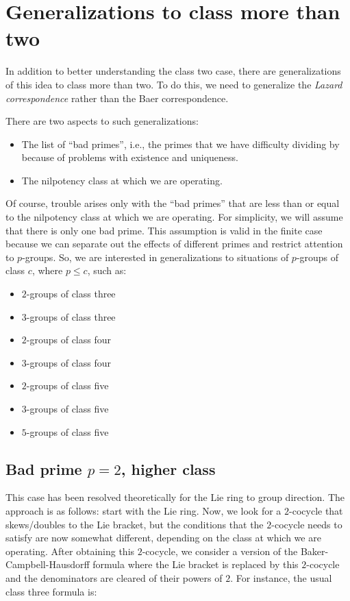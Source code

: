 \documentclass[10pt]{amsart}
\begin{document}
\section*{Generalizations to class more than two}

In addition to better understanding the class two case, there are
generalizations of this idea to class more than two. To do this, we
need to generalize the {\em Lazard correspondence} rather than the
Baer correspondence.

There are two aspects to such generalizations:

\begin{itemize}
\item The list of ``bad primes'', i.e., the primes that we have
  difficulty dividing by because of problems with existence and
  uniqueness.
\item The nilpotency class at which we are operating.
\end{itemize}

Of course, trouble arises only with the ``bad primes'' that are less
than or equal to the nilpotency class at which we are operating. For
simplicity, we will assume that there is only one bad prime. This
assumption is valid in the finite case because we can separate out the
effects of different primes and restrict attention to $p$-groups. So,
we are interested in generalizations to situations of $p$-groups of
class $c$, where $p \le c$, such as:

\begin{itemize}
\item $2$-groups of class three
\item $3$-groups of class three
\item $2$-groups of class four
\item $3$-groups of class four
\item $2$-groups of class five
\item $3$-groups of class five
\item $5$-groups of class five
\end{itemize}

\subsection*{Bad prime $p = 2$, higher class}

This case has been resolved theoretically for the Lie ring to group
direction. The approach is as follows: start with the Lie ring. Now,
we look for a $2$-cocycle that skews/doubles to the Lie bracket, but
the conditions that the $2$-cocycle needs to satisfy are now somewhat
different, depending on the class at which we are operating. After
obtaining this $2$-cocycle, we consider a version of the
Baker-Campbell-Hausdorff formula where the Lie bracket is replaced by
this $2$-cocycle and the denominators are cleared of their powers of
$2$. For instance, the usual class three formula is:
\end{document}
